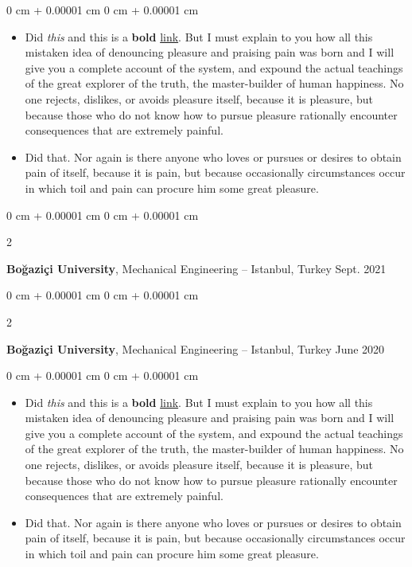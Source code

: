\documentclass[10pt, letterpaper]{article}
\newenvironment{highlights}{
    \begin{itemize}[
        topsep=0.10 cm,
        parsep=0.10 cm,
        partopsep=0pt,
        itemsep=0pt,
        leftmargin=0 cm + 10pt
    ]
}{
    \end{itemize}
} %
\newenvironment{onecolentry}{
    \begin{adjustwidth}{
        0 cm + 0.00001 cm
    }{
        0 cm + 0.00001 cm
    }
}{
    \end{adjustwidth}
} %
\newenvironment{twocolentry}[2][]{
    \onecolentry
    \def\secondColumn{#2}
    \setcolumnwidth{\fill, 4.5 cm}
    \begin{paracol}{2}
}{
    \switchcolumn \raggedleft \secondColumn
    \end{paracol}
    \endonecolentry
} %
\begin{document}
        \vspace{0.10 cm}
        \begin{onecolentry}
            \begin{highlights}
                \item Did \textit{this} and this is a \textbf{bold} \href{https://example.com}{link}. But I must explain to you how all this mistaken idea of denouncing pleasure and praising pain was born and I will give you a complete account of the system, and expound the actual teachings of the great explorer of the truth, the master-builder of human happiness. No one rejects, dislikes, or avoids pleasure itself, because it is pleasure, but because those who do not know how to pursue pleasure rationally encounter consequences that are extremely painful.
                \item Did that. Nor again is there anyone who loves or pursues or desires to obtain pain of itself, because it is pain, but because occasionally circumstances occur in which toil and pain can procure him some great pleasure.
            \end{highlights}
        \end{onecolentry}


        \vspace{0.2 cm}

        \begin{twocolentry}{
            Sept. 2021
        }
            \textbf{Boğaziçi University}, Mechanical Engineering -- Istanbul, Turkey\end{twocolentry}



        \vspace{0.2 cm}

        \begin{twocolentry}{
            June 2020
        }
            \textbf{Boğaziçi University}, Mechanical Engineering -- Istanbul, Turkey\end{twocolentry}

        \vspace{0.10 cm}
        \begin{onecolentry}
            \begin{highlights}
                \item Did \textit{this} and this is a \textbf{bold} \href{https://example.com}{link}. But I must explain to you how all this mistaken idea of denouncing pleasure and praising pain was born and I will give you a complete account of the system, and expound the actual teachings of the great explorer of the truth, the master-builder of human happiness. No one rejects, dislikes, or avoids pleasure itself, because it is pleasure, but because those who do not know how to pursue pleasure rationally encounter consequences that are extremely painful.
                \item Did that. Nor again is there anyone who loves or pursues or desires to obtain pain of itself, because it is pain, but because occasionally circumstances occur in which toil and pain can procure him some great pleasure.
            \end{highlights}
        \end{onecolentry}
\end{document}
